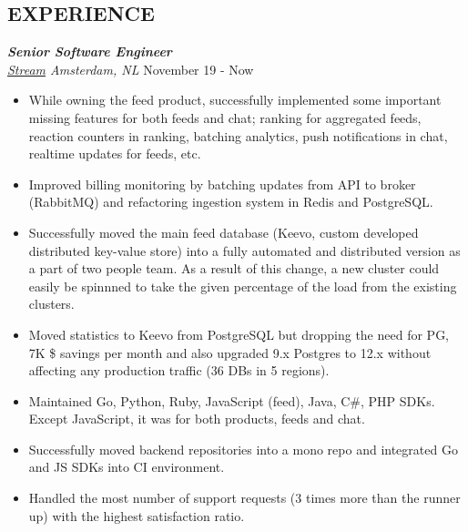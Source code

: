 \documentclass[line, margin]{res}
\begin{document}
\address{\hspace{0.1cm}\href{mailto:elmas.ferhat@gmail.com}{elmas.ferhat@gmail.com}}
\address{\hspace{0.3cm}\href{https://github.com/ferhatelmas}{github.com/ferhatelmas}}

\begin{resume}

\vspace{-0.4cm}

\section{EXPERIENCE}

{\sl \textbf{Senior Software Engineer} \\ \href{https://www.getstream.io}{Stream} Amsterdam, NL} \hfill November 19 - Now \\
\vspace{-0.3cm}
\begin{itemize}
  \item While owning the feed product, successfully implemented some important missing features for both feeds and chat; ranking for aggregated feeds, reaction counters in ranking, batching analytics, push notifications in chat, realtime updates for feeds, etc.
  \item Improved billing monitoring by batching updates from API to broker (RabbitMQ) and refactoring ingestion system in Redis and PostgreSQL.
  \item Successfully moved the main feed database (Keevo, custom developed distributed key-value store) into a fully automated and distributed version as a part of two people team. As a result of this change, a new cluster could easily be spinnned to take the given percentage of the load from the existing clusters.
  \item Moved statistics to Keevo from PostgreSQL but dropping the need for PG, 7K \$ savings per month and also upgraded 9.x Postgres to 12.x without affecting any production traffic (36 DBs in 5 regions).
  \item Maintained Go, Python, Ruby, JavaScript (feed), Java, C\#, PHP SDKs. Except JavaScript, it was for both products, feeds and chat. 
  \item Successfully moved backend repositories into a mono repo and integrated Go and JS SDKs into CI environment.
  \item Handled the most number of support requests (3 times more than the runner up) with the highest satisfaction ratio.
  

\end{itemize}
\end{resume}
\end{document}
